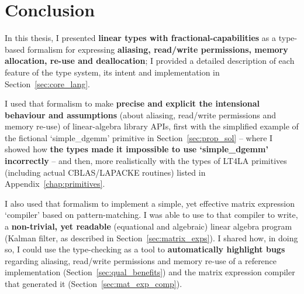 \chapter{Conclusion}

%

In this thesis, I presented \textbf{linear types with fractional-capabilities}
as a type-based formalism for expressing \textbf{aliasing, read/write
permissions, memory allocation, re-use and deallocation}; I provided a detailed
description of each feature of the type system, its intent and implementation
in Section~\ref{sec:core_lang}.

I used that formalism to make \textbf{precise and explicit the intensional
behaviour and assumptions} (about aliasing, read/write permissions and memory
re-use) of linear-algebra library APIs, first with the simplified example of
the fictional `simple\_dgemm' primitive in Section~\ref{sec:prop_sol} -- where
I showed how \textbf{the types made it impossible to use `simple\_dgemm'
incorrectly} -- and then, more realistically with the types of LT4LA primitives
(including actual CBLAS/LAPACKE routines) listed in
Appendix~\ref{chap:primitives}.

I also used that formalism to implement a simple, yet effective matrix
expression `compiler' based on pattern-matching. I was able to use to that
compiler to write, a \textbf{non-trivial, yet readable} (equational and
algebraic) linear algebra program (Kalman filter, as described in
Section~\ref{sec:matrix_exps}). I shared how, in doing so, I could use the
type-checking as a tool to \textbf{automatically highlight bugs} regarding
aliasing, read/write permissions and memory re-use of a reference
implementation (Section~\ref{sec:qual_benefits}) and the matrix expression
compiler that generated it (Section~\ref{sec:mat_exp_comp}).


